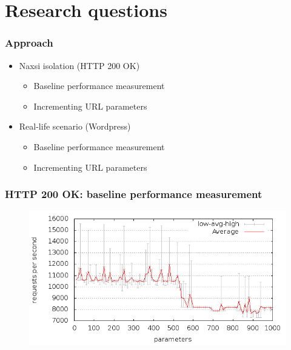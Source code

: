 \section{Research questions}


\begin{frame}[noframenumbering]
  \frametitle{Approach}
  \begin{itemize}
   \item Naxsi isolation (HTTP 200 OK)
     \begin{itemize}
       \item Baseline performance measurement
       \item Incrementing URL parameters
     \end{itemize}
   \item Real-life scenario (Wordpress)
     \begin{itemize}
       \item Baseline performance measurement
       \item Incrementing URL parameters
     \end{itemize}
  \end{itemize}
\end{frame}

\begin{frame}[noframenumbering]
  \frametitle{HTTP 200 OK: baseline performance measurement}
  \begin{figure}[H]
  \centering
  \includegraphics[scale=0.5] {../paper/images/results/baseline_200/output.png}
  \end{figure}
\end{frame}

